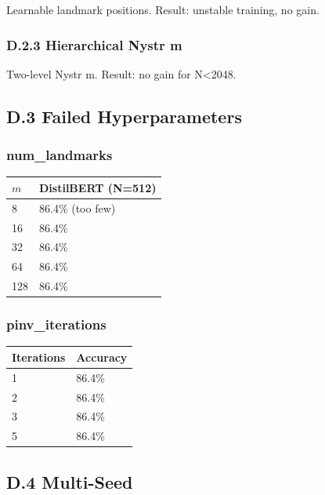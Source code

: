 Learnable landmark positions. Result: unstable training, no gain.

\subsubsection{D.2.3 Hierarchical Nystr m}

Two-level Nystr m. Result: no gain for N\textless{}2048.

\subsection{D.3 Failed Hyperparameters}

\subsubsection{num\_landmarks}

\begin{table}[H]
\centering
\small
\begin{tabular}{ll}
\toprule
\textbf{$m$} & \textbf{DistilBERT (N=512)} \\
\midrule
8 & 86.4\% (too few) \\
16 & 86.4\% \\
32 & 86.4\% \\
64 & 86.4\% \\
128 & 86.4\% \\
\bottomrule
\end{tabular}
\end{table}

\subsubsection{pinv\_iterations}

\begin{table}[H]
\centering
\small
\begin{tabular}{ll}
\toprule
\textbf{Iterations} & \textbf{Accuracy} \\
\midrule
1 & 86.4\% \\
2 & 86.4\% \\
3 & 86.4\% \\
5 & 86.4\% \\
\bottomrule
\end{tabular}
\end{table}

\subsection{D.4 Multi-Seed}


